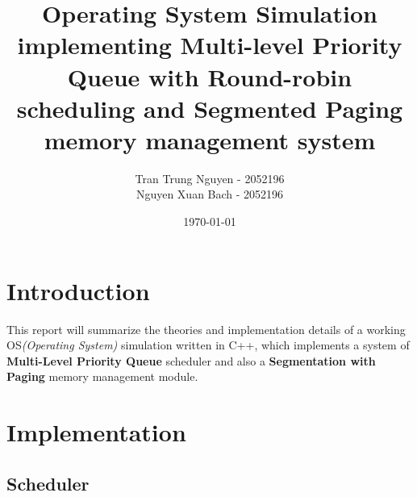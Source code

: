 \documentclass[]{article}
\title{Operating System Simulation implementing Multi-level Priority Queue with Round-robin scheduling and Segmented Paging memory management system}
\author{Tran Trung Nguyen - 2052196 \\
Nguyen Xuan Bach - 2052196}
\date{\today}
\begin{document}
\maketitle

\newpage
\tableofcontents
\newpage

\section{Introduction}
This report will summarize the theories and implementation details of a working OS\textit{(Operating System)} simulation written in C++, which implements a system of \textbf{Multi-Level Priority Queue} scheduler and also a \textbf{Segmentation with Paging} memory management module.
\section{Implementation}
\subsection{Scheduler}
\end{document}
